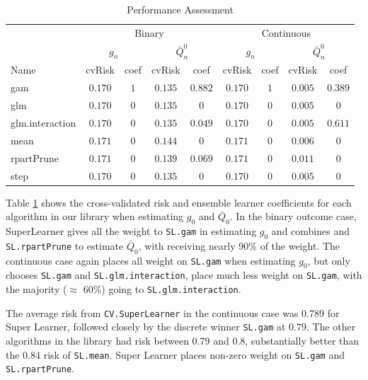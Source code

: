\documentclass[english, 12pt]{article}
\begin{document}
\begin{table}
    \centering
    \begin{tabular}{lcccccccc}
\toprule
 & \multicolumn{4}{c}{Binary} & \multicolumn{4}{c}{Continuous} \\
 \cmidrule(lr){2-5}\cmidrule(lr){6-9}
 & \multicolumn{2}{c}{$g_n$} & \multicolumn{2}{c}{$\bar{Q}_n^0$} & \multicolumn{2}{c}{$g_n$} &  \multicolumn{2}{c}{$\bar{Q}_n^0$} \\
 \cmidrule(lr){2-3}\cmidrule(lr){4-5}\cmidrule(lr){6-7}\cmidrule(lr){8-9}
Name  & cvRisk & coef & cvRisk & coef & cvRisk & coef & cvRisk & \multicolumn{1}{c}{coef} \\ 
\midrule
gam  & $0.170$ & $1$ & $0.135$ & $0.882$ & $0.170$ & $1$ & $0.005$ & $0.389$ \\
glm  & $0.170$ & $0$ & $0.135$ & $0$ & $0.170$ & $0$ & $0.005$ & $0$ \\
glm.interaction  & $0.170$ & $0$ & $0.135$ & $0.049$ & $0.170$ & $0$ & $0.005$ & $0.611$ \\
mean  & $0.171$ & $0$ & $0.144$ & $0$ & $0.171$ & $0$ & $0.006$ & $0$ \\
rpartPrune  & $0.171$ & $0$ & $0.139$ & $0.069$ & $0.171$ & $0$ & $0.011$ & $0$ \\
step  & $0.170$ & $0$ & $0.135$ & $0$ & $0.170$ & $0$ & $0.005$ & $0$ \\
\bottomrule 
\end{tabular}
    \caption{Performance Assessment}
    \label{tab:performance}
\end{table}

Table \ref{tab:performance} shows the cross-validated risk and ensemble learner coefficients for each algorithm in our library when estimating $g_0$ and $\bar{Q}_0$. In the binary outcome case, SuperLearner gives all the weight to \texttt{SL.gam} in estimating $g_0$ and combines  and \texttt{SL.rpartPrune} to estimate $\bar{Q}_0$, with  receiving nearly 90\% of the weight. The continuous case again places all weight on \texttt{SL.gam} when estimating $g_0$, but only chooses \texttt{SL.gam} and \texttt{SL.glm.interaction}, place much less weight on \texttt{SL.gam}, with the majority ($\approx$ 60\%) going to \texttt{SL.glm.interaction}.

The average risk from \texttt{CV.SuperLearner} in the continuous case was 0.789 for Super Learner, followed closely by the discrete winner \texttt{SL.gam} at 0.79. The other algorithms in the library had risk between 0.79 and 0.8, substantially better than the 0.84 risk of \texttt{SL.mean}. Super Learner places non-zero weight on \texttt{SL.gam} and \texttt{SL.rpartPrune}.
\end{document}

